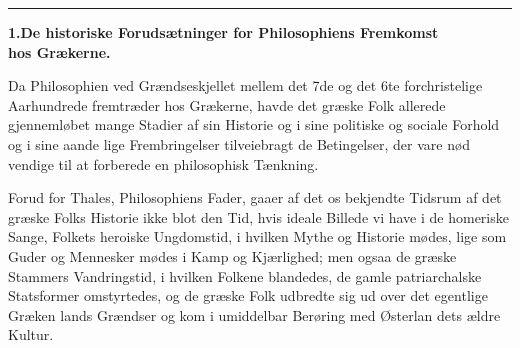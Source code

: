 \documentclass[12pt,a4paper]{book}
\newcommand{\divrule}{\begin{center}\rule{2cm}{0.4pt}\end{center}}
\begin{document}
\divrule
\begin{center}
\textbf{1.\enspace De historiske Forudsætninger for Philosophiens Fremkomst\\
hos Grækerne.}
\end{center}
Da Philosophien ved Grændseskjellet mellem det 7de og det
6te forchristelige Aarhundrede fremtræder hos Grækerne, havde
det græske Folk allerede gjennemløbet mange Stadier af sin
Historie og i sine politiske og sociale Forhold og i sine aande\-%
lige Frembringelser tilveiebragt de Betingelser, der vare nød\-%
vendige til at forberede en philosophisk Tænkning.

Forud for Thales, Philosophiens Fader, gaaer af det os
bekjendte Tidsrum af det græske Folks Historie ikke blot den
Tid, hvis ideale Billede vi have i de homeriske Sange, Folkets
heroiske Ungdomstid, i hvilken Mythe og Historie mødes, lige\-%
som Guder og Mennesker mødes i Kamp og Kjærlighed; men
ogsaa de græske Stammers Vandringstid, i hvilken Folkene
blandedes, de gamle patriarchalske Statsformer omstyrtedes,
og de græske Folk udbredte sig ud over det egentlige Græken\-%
lands Grændser og kom i umiddelbar Berøring med Østerlan\-%
dets ældre Kultur.
\end{document}
